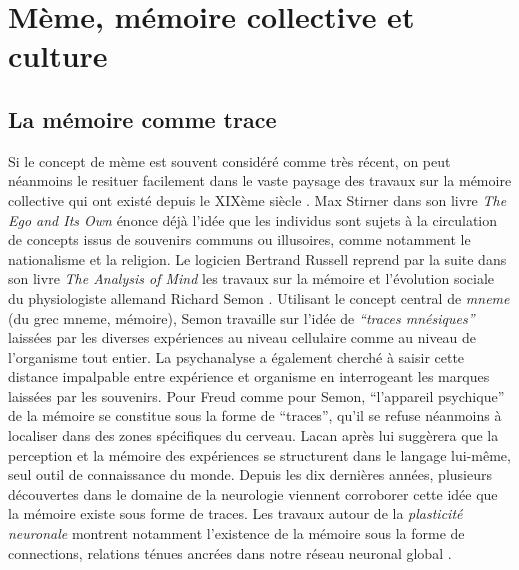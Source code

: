 \section[Mème, mémoire collective et culture]{Mème, mémoire collective et culture}
\subsection[La mémoire comme trace]{La mémoire comme trace}

Si le concept de mème est souvent considéré comme très récent, on peut néanmoins le resituer facilement dans le vaste paysage des travaux sur la mémoire collective qui ont existé depuis le XIXème siècle \citep{Laurent1999}. Max Stirner dans son livre \textit{The Ego and Its Own }\citeyear{Stirner1995} énonce déjà l{\textquoteright}idée que les individus sont sujets à la circulation de concepts issus de souvenirs communs ou illusoires, comme notamment le nationalisme et la religion. Le logicien Bertrand Russell reprend par la suite dans son livre \textit{The Analysis of Mind } \citeyear{Russell1921} les travaux sur la mémoire et l{\textquoteright}évolution sociale du physiologiste allemand Richard Semon \citeyear{Semon1923}. Utilisant le concept central de \textit{mneme} (du grec 
mneme, mémoire), Semon travaille sur l{\textquoteright}idée de \textit{{\textquotedblleft}traces mnésiques{\textquotedblright} }laissées par les diverses expériences au niveau cellulaire comme au niveau de l{\textquoteright}organisme tout entier. La psychanalyse a également cherché à saisir cette distance impalpable entre expérience et organisme en interrogeant les marques laissées par les souvenirs. Pour Freud comme pour Semon, {\textquotedblleft}l{\textquoteright}appareil psychique{\textquotedblright} de la mémoire se constitue sous la forme de {\textquotedblleft}traces{\textquotedblright}, qu{\textquoteright}il se refuse néanmoins à localiser dans des zones spécifiques du cerveau. Lacan après lui suggèrera que la perception et la mémoire des expériences se structurent dans le langage lui-même, seul outil de connaissance du monde. Depuis les dix dernières années, plusieurs découvertes dans le domaine de la neurologie viennent corroborer cette idée que la mémoire existe sous forme de traces. Les travaux autour de la \textit{plasticité neuronale }montrent notamment l{\textquoteright}existence de la mémoire sous la forme de connections, relations ténues ancrées dans notre réseau neuronal global \citep{Magistretti2008}.  

